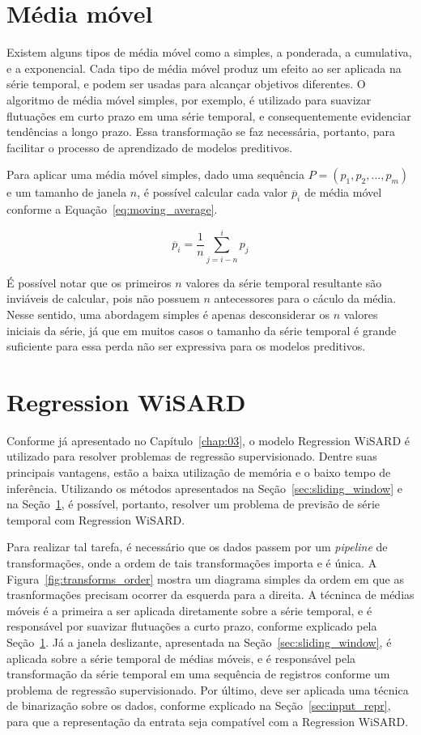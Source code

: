 \section{Média móvel} \label{sec:moving_average}
Existem alguns tipos de média móvel como a simples, a ponderada, a cumulativa, e a exponencial. Cada tipo de média móvel produz um efeito ao ser aplicada na série temporal, e podem ser usadas para alcançar objetivos diferentes. O algoritmo de média móvel simples, por exemplo, é utilizado para suavizar flutuações em curto prazo em uma série temporal, e consequentemente evidenciar tendências a longo prazo. Essa transformação se faz necessária, portanto, para facilitar o processo de aprendizado de modelos preditivos.

Para aplicar uma média móvel simples, dado uma sequência $P = (p_{1}, p_{2}, ..., p_{m})$ e um tamanho de janela $n$, é possível calcular cada valor $\overline{p}_{i}$ de média móvel conforme a Equação~\ref{eq:moving_average}.

\begin{equation} \label{eq:moving_average}
    \overline{p}_{i} = \dfrac{1}{n}\sum ^{i}_{j=i-n}p_{j}
\end{equation}

É possível notar que os primeiros $n$ valores da série temporal resultante são inviáveis de calcular, pois não possuem $n$ antecessores para o cáculo da média. Nesse sentido, uma abordagem simples é apenas desconsiderar os $n$ valores iniciais da série, já que em muitos casos o tamanho da série temporal é grande suficiente para essa perda não ser expressiva para os modelos preditivos.

\section{Regression WiSARD}
Conforme já apresentado no Capítulo~\ref{chap:03}, o modelo Regression WiSARD é utilizado para resolver problemas de regressão supervisionado. Dentre suas principais vantagens, estão a baixa utilização de memória e o baixo tempo de inferência. Utilizando os métodos apresentados na Seção~\ref{sec:sliding_window} e na Seção~\ref{sec:moving_average}, é possível, portanto, resolver um problema de previsão de série temporal com Regression WiSARD.

Para realizar tal tarefa, é necessário que os dados passem por um \textit{pipeline} de transformações, onde a ordem de tais transformações importa e é única. A Figura~\ref{fig:transforms_order} mostra um diagrama simples da ordem em que as trasnformações precisam ocorrer da esquerda para a direita. A técninca de médias móveis é a primeira a ser aplicada diretamente sobre a série temporal, e é responsável por suavizar flutuações a curto prazo, conforme explicado pela Seção~\ref{sec:moving_average}. Já a janela deslizante, apresentada na Seção~\ref{sec:sliding_window}, é aplicada sobre a série temporal de médias móveis, e é responsável pela transformação da série temporal em uma sequência de registros conforme um problema de regressão supervisionado. Por último, deve ser aplicada uma técnica de binarização sobre os dados, conforme explicado na Seção~\ref{sec:input_repr}, para que a representação da entrata seja compatível com a Regression WiSARD.

